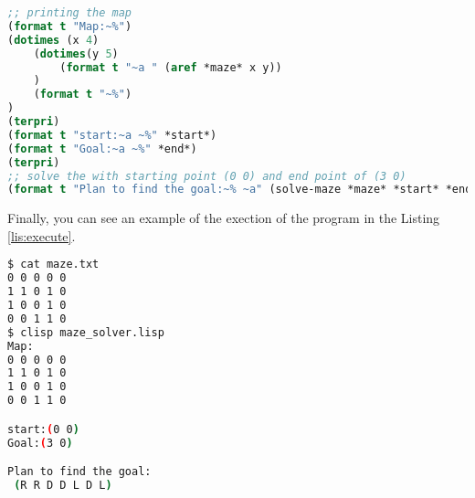 \begin{lstlisting}[language=Lisp, style=mystyle,
                 caption=final part of program,
                 label=lis:final]
       ;; printing the map
(format t "Map:~%")        
(dotimes (x 4)
    (dotimes(y 5)
        (format t "~a " (aref *maze* x y))
    )
    (format t "~%")
)
(terpri)
(format t "start:~a ~%" *start*) 
(format t "Goal:~a ~%" *end*) 
(terpri)
;; solve the with starting point (0 0) and end point of (3 0)
(format t "Plan to find the goal:~% ~a" (solve-maze *maze* *start* *end*))          
\end{lstlisting}
Finally, you can see an example of the exection of the program in the
Listing \ref{lis:execute}. 
\begin{lstlisting}[language=Bash,
caption= Exectuion of the program,
label=lis:execute,
backgroundcolor=\color{backcolour},
keywordstyle=\color{magenta},
otherkeywords={clisp},
emph={$},
emphstyle={\color{deepblue}\ttfamily},
]
$ cat maze.txt
0 0 0 0 0 
1 1 0 1 0 
1 0 0 1 0
0 0 1 1 0
$ clisp maze_solver.lisp
Map:
0 0 0 0 0 
1 1 0 1 0 
1 0 0 1 0 
0 0 1 1 0 

start:(0 0) 
Goal:(3 0) 

Plan to find the goal:
 (R R D D L D L)
\end{lstlisting}